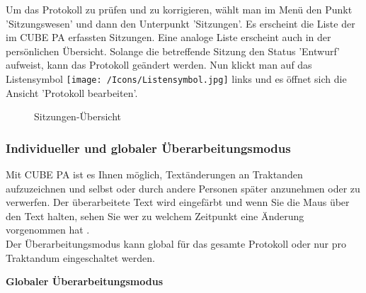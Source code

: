 \vspace{\baselineskip}

Um das Protokoll zu prüfen und zu korrigieren, wählt man im Menü den Punkt 'Sitzungswesen' und dann den Unterpunkt 'Sitzungen'. Es erscheint die Liste der im CUBE PA erfassten Sitzungen. Eine analoge Liste erscheint auch in der persönlichen Übersicht. Solange die betreffende Sitzung den Status 'Entwurf' aufweist, kann das Protokoll geändert werden. Nun klickt man auf das Listensymbol \texttt{[image: /Icons/Listensymbol.jpg]}  links und es öffnet sich die Ansicht 'Protokoll bearbeiten'.

\begin{figure}[H]
\caption{Sitzungen-Übersicht}
\end{figure}

\vspace{\baselineskip}


\subsubsection{Individueller und globaler Überarbeitungsmodus}

\vspace{\baselineskip}

Mit CUBE PA ist es Ihnen möglich, Textänderungen an Traktanden aufzuzeichnen und selbst oder durch andere Personen später anzunehmen oder zu verwerfen. Der überarbeitete Text wird eingefärbt  und wenn Sie die Maus über den Text halten, sehen Sie wer zu welchem Zeitpunkt eine Änderung vorgenommen hat .\\

Der Überarbeitungsmodus kann global für das gesamte Protokoll oder nur pro Traktandum eingeschaltet werden.

\vspace{\baselineskip}

\textbf{Globaler Überarbeitungsmodus}

